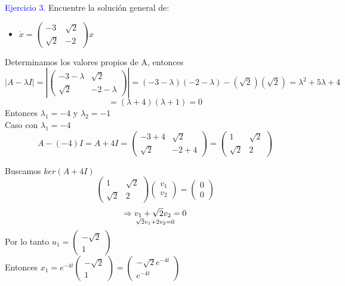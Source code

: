 \textcolor{blue}{Ejercicio 3.} Encuentre la solución general de:
\begin{itemize}
    \item $\dot x = 
\begin{pmatrix}
-3 & \sqrt{2} \\
\sqrt{2} & -2
\end{pmatrix}x$
\end{itemize}

Determinamos los valores propios de A, entonces
\begin{equation*}
    |A - \lambda I| = 
|\begin{pmatrix}
-3 - \lambda & \sqrt{2} \\
\sqrt{2} & -2 - \lambda
\end{pmatrix}| 
= (-3 - \lambda)(-2 - \lambda)-(\sqrt{2} )(\sqrt{2} )= \lambda^{2}+5\lambda+4
\end{equation*}
\begin{equation*}
    = (\lambda +4)(\lambda +1 )= 0
\end{equation*}
Entonces $\lambda_{1}=-4$ y $\lambda_{2}=-1$ \\

Caso con $\lambda_{1}=-4$ 
\begin{equation*}
    A - (-4) I = A +4 I =
\begin{pmatrix}
-3 + 4 & \sqrt{2} \\
\sqrt{2} & -2+4
\end{pmatrix}
=
\begin{pmatrix}
1 & \sqrt{2} \\
\sqrt{2} & 2
\end{pmatrix}
\end{equation*}

Buscamos $ker(A +4 I)$
\begin{equation*}
    \begin{pmatrix}
1 & \sqrt{2} \\
\sqrt{2} & 2
\end{pmatrix}
\begin{pmatrix}
v_{1}   \\
v_{2}  
\end{pmatrix} =
\begin{pmatrix}
0   \\
0  
\end{pmatrix}
\end{equation*}
\begin{equation*}
    \Rightarrow v_{1}+ \sqrt{2}v_{2}=0 \atop
    \sqrt{2}v_{1}+2v_{2} =0
\end{equation*}
Por lo tanto $u_{1}=\begin{pmatrix}
-\sqrt{2} \\
1
\end{pmatrix}$ \\
Entonces $x_{1}=e^{-4t}\begin{pmatrix}
-\sqrt{2} \\
1
\end{pmatrix}
=
\begin{pmatrix}
-\sqrt{2}e^{-4t} \\
e^{-4t}
\end{pmatrix}$ 

